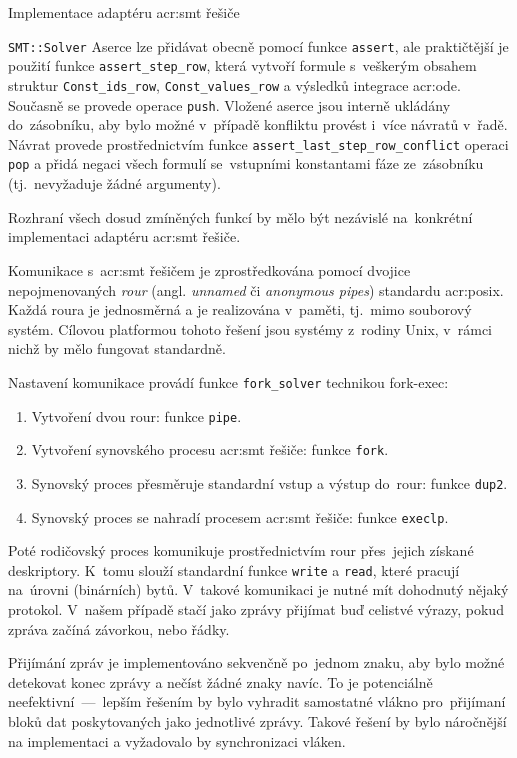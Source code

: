 \documentclass[thesis=M,czech]{FITthesis}[2012/06/26]
\newcommand{\acrlabel}[1]{acr:#1}
\newcommand{\acr}[1]{\acrshort{\acrlabel{#1}}}
\newcommand{\id}[1]{\texttt{#1}}
\newcommand{\hl}[1]{\textit{#1}}
\newcommand{\name}[1]{\hl{#1}}
\begin{document}
\begin{section}{Implementace adaptéru \acr{smt} řešiče}
\begin{paragraph}{\id{SMT::\-Solver}}
Aserce lze přidávat obecně pomocí funkce \id{assert},
ale praktičtější je použití funkce \id{assert\_\-step\_\-row},
která vytvoří formule s~veškerým obsahem struktur
\id{Const\_\-ids\_\-row}, \id{Const\_\-values\_\-row}
a výsledků integrace \acr{ode}.
Současně se provede operace \id{push}.
Vložené aserce jsou interně ukládány do~zásobníku,
aby bylo možné v~případě konfliktu
provést i~více návratů v~řadě.
Návrat provede prostřednictvím funkce
\id{assert\_\-last\_\-step\_\-row\_\-conflict}
operaci \id{pop} a přidá negaci
všech formulí se~vstupními konstantami fáze
ze~zásobníku (tj.~nevyžaduje žádné argumenty).

Rozhraní všech dosud zmíněných funkcí by mělo být nezávislé
na~konkrétní implementaci adaptéru \acr{smt} řešiče.
\end{paragraph} %


\begin{paragraph}{Komunikace s~\acr{smt} řešičem}\label{s:impl:smt:pipe}
je zprostředkována pomocí dvojice nepojmenovaných
\name{rour} (angl. \name{unnamed} či \name{anonymous pipes})
standardu \acr{posix}. Každá roura je jednosměrná
a je realizována v~paměti, tj.~mimo souborový systém.
Cílovou platformou tohoto řešení jsou systémy z~rodiny Unix,
v~rámci nichž by mělo fungovat standardně.

Nastavení komunikace provádí funkce \id{fork\_\-solver}
technikou fork-exec:
\begin{enumerate}
\item Vytvoření dvou rour: funkce \id{pipe}.
\item Vytvoření synovského procesu \acr{smt} řešiče: funkce \id{fork}.
\item Synovský proces přesměruje standardní vstup a výstup do~rour:
   funkce \id{dup2}.
\item Synovský proces se nahradí procesem \acr{smt} řešiče:
   funkce \id{execlp}.
\end{enumerate}

Poté rodičovský proces komunikuje prostřednictvím rour
přes~jejich získané deskriptory.
K~tomu slouží standardní funkce \id{write} a \id{read},
které pracují na~úrovni (binárních) bytů.
V~takové komunikaci je nutné mít dohodnutý nějaký protokol.
V~našem případě stačí jako zprávy přijímat
buď celistvé výrazy, pokud zpráva začíná závorkou,
nebo řádky.

Přijímání zpráv je implementováno sekvenčně po~jednom znaku,
aby bylo možné detekovat konec zprávy a nečíst žádné znaky navíc.
To je potenciálně neefektivní~---~lepším řešením by bylo
vyhradit samostatné vlákno pro~přijímaní bloků dat
poskytovaných jako jednotlivé zprávy.
Takové řešení by bylo náročnější na implementaci
a vyžadovalo by synchronizaci vláken.
\end{paragraph} %


\end{section} %
\end{document}
